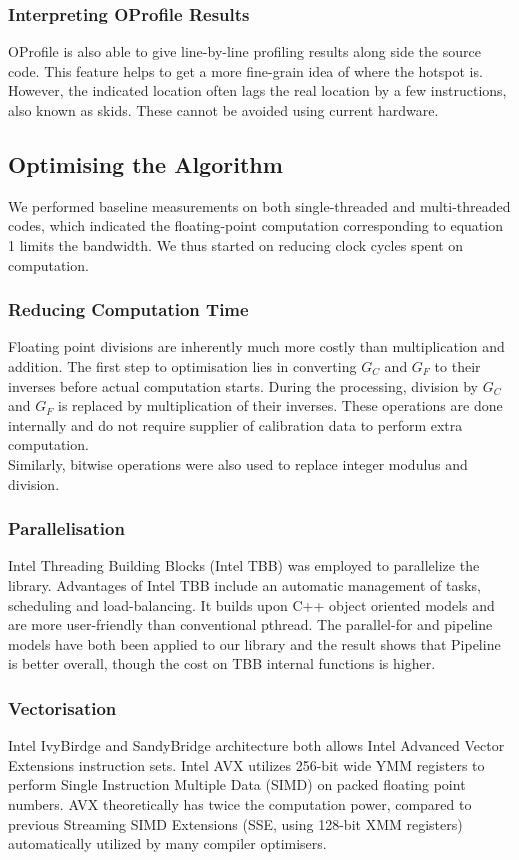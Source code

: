 \documentclass[journal]{IEEEtran}
\begin{document}
\subsubsection{Interpreting OProfile Results}
OProfile is also able to give line-by-line profiling results along side the source code. This feature helps to get a more fine-grain idea of where the hotspot is. However, the indicated location often lags the real location by a few instructions, also known as skids. These cannot be avoided using current hardware.

\subsection{Optimising the Algorithm}
We performed baseline measurements on both single-threaded and multi-threaded codes, which indicated the floating-point computation corresponding to equation 1 limits the bandwidth. We thus started on reducing clock cycles spent on computation.
\subsubsection{Reducing Computation Time}
Floating point divisions are inherently much more costly than multiplication and addition. The first step to optimisation lies in converting $G_C$ and $G_F$ to their inverses before actual computation starts. During the processing, division by $G_C$ and $G_F$ is replaced by multiplication of their inverses. These operations are done internally and do not require supplier of calibration data to perform extra computation.\\
Similarly, bitwise operations were also used to replace integer modulus and division.\\
\subsubsection{Parallelisation}
Intel Threading Building Blocks (Intel TBB) was employed to parallelize the library. Advantages of Intel TBB include an automatic management of tasks, scheduling and load-balancing. It builds upon C++ object oriented models and are more user-friendly than conventional pthread. The parallel-for and pipeline models have both been applied to our library and the result shows that Pipeline is better overall, though the cost on TBB internal functions is higher.

\subsubsection{Vectorisation}
Intel IvyBirdge and SandyBridge architecture both allows Intel Advanced Vector Extensions instruction sets. Intel AVX utilizes 256-bit wide YMM registers to perform Single Instruction Multiple Data (SIMD) on packed floating point numbers. AVX theoretically has twice the computation power, compared to previous Streaming SIMD Extensions (SSE, using 128-bit XMM registers) automatically utilized by many compiler optimisers. 
\end{document}
